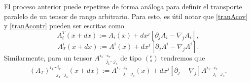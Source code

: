 El proceso anterior puede repetirse de forma análoga para definir
el transporte paralelo de un tensor de rango arbitrario. Para esto, es útil notar que 
\eqref{tranAcov} y \eqref{tranAcontr} pueden ser escritas como
\begin{equation}
A^T_i(x+dx):=A_i(x)+dx^j\left[\partial_jA_i-\nabla_jA_i\right],
\end{equation}
\begin{equation}
A_T^i(x+dx):=A^i(x)+dx^j\left[\partial_jA^i-\nabla_jA^i\right].
\end{equation}
Similarmente, para un tensor $A^{i_1\cdots i_r}_{\ \ \ \ \ \ j_1\cdots j_s}$ de tipo $(^r_s)$ tendremos que
\begin{equation}
(A_T)^{i_1\cdots i_r}_{\ \ \ \ \ \ j_1\cdots j_s}(x+dx):=A^{i_1\cdots i_r}_{\ \ \ \ \ \ j_1\cdots j_s}(x)+dx^j\left[\partial_j-\nabla_j\right]A^{i_1\cdots i_r}_{\ \ \ \ \ \ j_1\cdots j_s}.
\end{equation}


